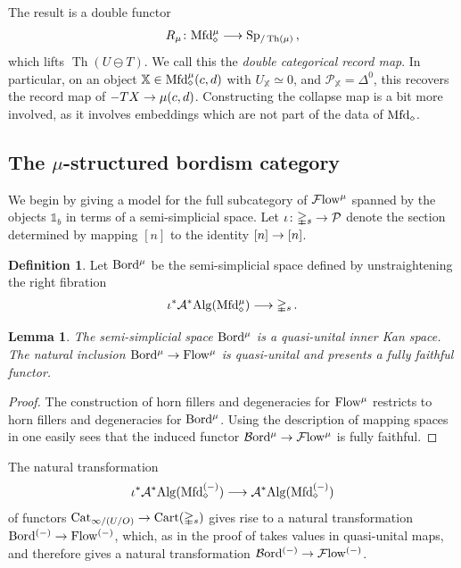 \documentclass[10pt]{amsart}
\numberwithin{equation}{section}
\newtheorem{lem}[prop]{Lemma}
\theoremstyle{definition}
\newtheorem{definition}[prop]{Definition}
\DeclareMathOperator{\Th}{Th}
\DeclareMathOperator{\Cart}{Cart}
\newcommand{\Flow}{\cF\mathrm{low}\vphantom{w}}
\newcommand{\PreFlow}{\mathrm{Flow}\vphantom{w}}
\newcommand{\Bord}{\mathcal{B}\mathrm{ord}\vphantom{d}}
\newcommand{\PreBord}{\mathrm{Bord}\vphantom{d}}
\newcommand{\Cat}{\mathrm{Cat}\vphantom{t}}
\newcommand{\Mfd}{\mathrm{Mfd}\vphantom{d}}
\newcommand{\Alg}{\mathrm{Alg}\vphantom{z}}
\newcommand{\bX}{\mathbb{X}}
\newcommand{\bOne}{\mathbb{1}}
\newcommand{\Simp}{\mathbb{\Delta}}
\newcommand{\cA}{\mathcal{A}}
\newcommand{\cP}{\mathcal{P}}
\newcommand{\cF}{\mathcal{F}}
\newcommand{\Sp}{\mathrm{Sp}\vphantom{p}}
\renewcommand{\to}{\mathchoice{\longrightarrow}{\rightarrow}{}{}}
\begin{document}
The result is a double functor
\begin{align*}
	R_{\mu} \colon \Mfd_{\diamond}^{\mu} \to \Sp_{/\Th(\mu)} \,,
\end{align*}
which lifts $\Th(U\ominus T)$.
We call this the \emph{double categorical record map}.
In particular, on an object $\bX\in \Mfd_{\diamond}^{\mu}(c,d)$ with $U_{\bX}\simeq 0$, and $\cP_{\bX} = \Delta^{0}$, this recovers the record map of $-TX \to \mu(c,d)$.
Constructing the collapse map is a bit more involved, as it involves embeddings which are not part of the data of $\Mfd_{\diamond}$.

\subsection{The $\mu$-structured bordism category}\label{subsec:the_structured_bordism_category}

We begin by giving a model for the full subcategory of $\Flow^{\mu}$ spanned by the objects $\bOne_{b}$ in terms of a semi-simplicial space.
Let $\iota\colon \Simp_{s} \to \cP$ denote the section determined by mapping $[n]$ to the identity $[n]\to [n]$.

\begin{definition}\label{def:PreBord}
	Let $\PreBord^{\mu}$ be the semi-simplicial space defined by unstraightening the right fibration
	\begin{align*}
		\iota^{*}\cA^{*}\Alg(\Mfd_{\diamond}^{\mu})\to \Simp_{s} \,.
	\end{align*}
\end{definition}

\begin{lem}\label{lem:Bord->Flow}
	The semi-simplicial space $\PreBord^{\mu}$ is a quasi-unital inner Kan space. The natural inclusion $\PreBord^{\mu}\to \PreFlow^{\mu}$ is quasi-unital and presents a fully faithful functor.
\end{lem}

\begin{proof}
	The construction of horn fillers and degeneracies for $\PreFlow^{\mu}$ restricts to horn fillers and degeneracies for $\PreBord^{\mu}$.
  Using the description of mapping spaces in  one easily sees that the induced functor $\Bord^{\mu}\to \Flow^{\mu}$ is fully faithful.
\end{proof}
The natural transformation
\begin{align*}
	\iota^{*}\cA^{*}\Alg(\Mfd^{(-)}_{\diamond}) \to \cA^{*}\Alg(\Mfd^{(-)}_{\diamond})
\end{align*}
of functors $\Cat_{\infty / (U/O)} \to \Cart(\Simp_{s})$ gives rise to a natural transformation $\PreBord^{(-)} \to \PreFlow^{(-)}$, which, as in the proof of  takes values in quasi-unital maps, and therefore gives a natural transformation $\Bord^{(-)}\to \Flow^{(-)}$.
\end{document}
